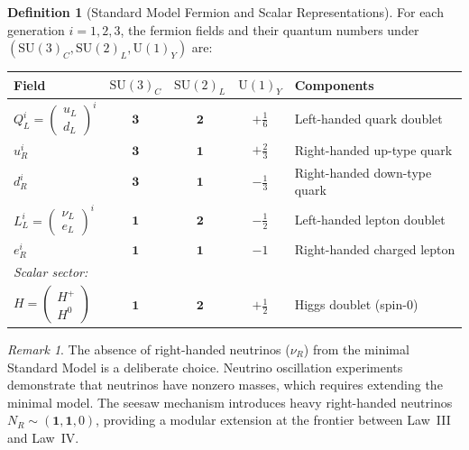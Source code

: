 \documentclass[12pt]{article}
\theoremstyle{definition}
\newtheorem{definition}[theorem]{Definition}
\theoremstyle{remark}
\newtheorem{remark}[theorem]{Remark}
\newcommand{\su}[1]{\mathrm{SU}(#1)}
\newcommand{\uu}[1]{\mathrm{U}(#1)}
\begin{document}
\begin{definition}[Standard Model Fermion and Scalar Representations]
\label{def:fermion-reps}
For each generation $i = 1, 2, 3$, the fermion fields and their quantum numbers under $(\su{3}_C, \su{2}_L, \uu{1}_Y)$ are:

\begin{center}
\renewcommand{\arraystretch}{1.3}
\begin{tabular}{lcccl}
\toprule
\textbf{Field} & $\su{3}_C$ & $\su{2}_L$ & $\uu{1}_Y$ & \textbf{Components} \\
\midrule
$Q_L^i = \begin{pmatrix} u_L \\ d_L \end{pmatrix}^i$ & $\mathbf{3}$ & $\mathbf{2}$ & $+\tfrac{1}{6}$ & Left-handed quark doublet \\[8pt]
$u_R^i$ & $\mathbf{3}$ & $\mathbf{1}$ & $+\tfrac{2}{3}$ & Right-handed up-type quark \\
$d_R^i$ & $\mathbf{3}$ & $\mathbf{1}$ & $-\tfrac{1}{3}$ & Right-handed down-type quark \\[4pt]
$L_L^i = \begin{pmatrix} \nu_L \\ e_L \end{pmatrix}^i$ & $\mathbf{1}$ & $\mathbf{2}$ & $-\tfrac{1}{2}$ & Left-handed lepton doublet \\[8pt]
$e_R^i$ & $\mathbf{1}$ & $\mathbf{1}$ & $-1$ & Right-handed charged lepton \\[4pt]
\midrule
\multicolumn{5}{l}{\textit{Scalar sector:}} \\[2pt]
$H = \begin{pmatrix} H^+ \\ H^0 \end{pmatrix}$ & $\mathbf{1}$ & $\mathbf{2}$ & $+\tfrac{1}{2}$ & Higgs doublet (spin-0) \\
\bottomrule
\end{tabular}
\end{center}
\end{definition}

\begin{remark}
The absence of right-handed neutrinos ($\nu_R$) from the minimal Standard Model is a deliberate choice. Neutrino oscillation experiments demonstrate that neutrinos have nonzero masses, which requires extending the minimal model. The seesaw mechanism introduces heavy right-handed neutrinos $N_R \sim (\mathbf{1}, \mathbf{1}, 0)$, providing a modular extension at the frontier between Law~III and Law~IV.
\end{remark}
\end{document}
